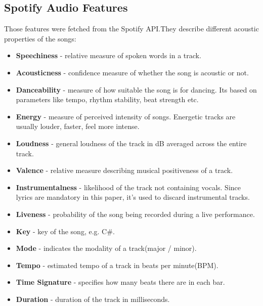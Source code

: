 \subsection{Spotify Audio Features}
\label{sec:spotifyaudiofeatures}
Those features were fetched from the Spotify API.They describe different
acoustic properties of the songs:
\begin{itemize}
  \item \textbf{Speechiness} - relative measure of spoken words in a track.
  \item \textbf{Acousticness} - confidence measure of whether the song is
    acoustic or not.
  \item \textbf{Danceability} - measure of how suitable the song is for
    dancing. Its based on parameters like tempo, rhythm stability, beat
    strength etc.
  \item \textbf{Energy} - measure of perceived intensity of songs. Energetic
    tracks are usually louder, faster, feel more intense.
  \item \textbf{Loudness} - general loudness of the  track in dB averaged
    across the entire track.
  \item \textbf{Valence} - relative measure describing musical positiveness of
    a track.
  \item \textbf{Instrumentalness} - likelihood of the track not containing
    vocals. Since lyrics are mandatory in this paper, it's used to discard
    instrumental tracks.
  \item \textbf{Liveness} - probability of the song being recorded during a
    live performance.
  \item \textbf{Key} - key of the song, e.g. C\#.
  \item \textbf{Mode} - indicates the modality of a track(major / minor).
  \item \textbf{Tempo} - estimated tempo of a track in beats per minute(BPM).
  \item \textbf{Time Signature} - specifies how many beats there are in each
    bar.
  \item \textbf{Duration} - duration of the track in milliseconds.
\end{itemize}


